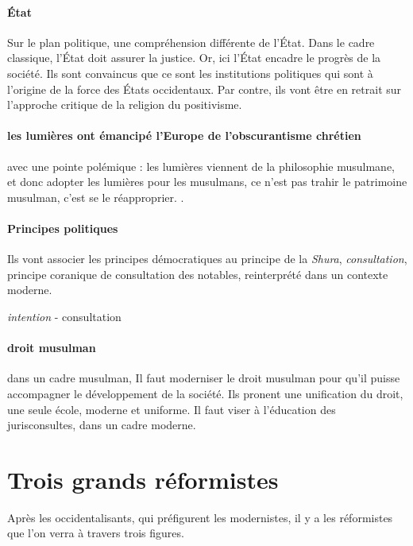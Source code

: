  
 \paragraph{État}  Sur le plan politique, une compréhension différente de l'État. Dans le cadre classique, l'État doit assurer la justice. Or, ici l'État encadre le progrès de la société. Ils sont convaincus que ce sont les institutions politiques qui sont à l'origine de la force des États occidentaux. Par contre, ils vont être en retrait sur l'approche critique de la religion du positivisme.
 
 \paragraph{les lumières ont émancipé l'Europe de l'obscurantisme chrétien} avec une pointe polémique : les lumières viennent de la philosophie musulmane, et donc adopter les lumières pour les musulmans, ce n'est pas trahir le patrimoine musulman, c'est se le réapproprier. .
 
 \paragraph{Principes politiques} Ils vont associer les principes démocratiques au principe de la \emph{Shura}, \textit{consultation}, principe coranique de consultation des notables, reinterprété dans un contexte moderne.
 \begin{Def}[shura]
    \emph{ intention} - consultation
\end{Def} 
 \paragraph{droit musulman} dans un cadre musulman, Il faut moderniser le droit musulman pour qu'il puisse accompagner le développement de la société. Ils pronent une unification du droit, une seule école, moderne et uniforme. Il faut viser à l'éducation des jurisconsultes, dans un cadre moderne. 
  
  \section{Trois grands réformistes}
   
   Après les occidentalisants, qui préfigurent les modernistes, il y a les réformistes que l'on verra à travers trois figures.
   
